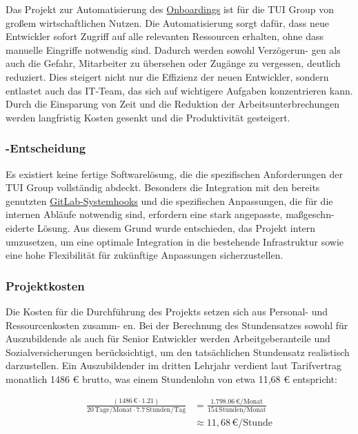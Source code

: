 Das Projekt zur Automatisierung des \hyperlink{Onboarding}{\textcolor{AOBlau}{Onboardings}} ist für die TUI Group von großem wirtschaftlichen Nutzen. Die Automatisierung sorgt dafür, dass neue Entwickler sofort Zugriff auf alle relevanten Ressourcen erhalten, ohne dass manuelle Eingriffe notwendig sind. Dadurch werden sowohl Verzögerun-
gen als auch die Gefahr, Mitarbeiter zu übersehen oder Zugänge zu vergessen, deutlich reduziert. Dies steigert nicht nur die Effizienz der neuen Entwickler, sondern entlastet auch das IT-Team, das sich auf wichtigere Aufgaben konzentrieren kann. Durch die Einsparung von Zeit und die Reduktion der Arbeitsunterbrechungen werden langfristig Kosten gesenkt und die Produktivität gesteigert.

\subsubsection{-Entscheidung}
\label{sec:MakeOrBuyEntscheidung}

Es existiert keine fertige Softwarelösung, die die spezifischen Anforderungen der TUI Group vollständig abdeckt. Besonders die Integration mit den bereits genutzten \hyperlink{GitLabSystemHooks}{\textcolor{AOBlau}{GitLab-Systemhooks}} und die spezifischen Anpassungen, die für die internen Abläufe notwendig sind, erfordern eine stark angepasste, maßgeschn-
eiderte Lösung. Aus diesem Grund wurde entschieden, das Projekt intern umzusetzen, um eine optimale Integration in die bestehende Infrastruktur sowie eine hohe Flexibilität für zukünftige Anpassungen sicherzustellen.

\subsubsection{Projektkosten}
\label{sec:Projektkosten}

Die Kosten für die Durchführung des Projekts setzen sich aus Personal- und Ressourcenkosten zusamm-
en. Bei der Berechnung des Stundensatzes sowohl für Auszubildende als auch für Senior Entwickler werden Arbeitgeberanteile und Sozialversicherungen berücksichtigt, um den tatsächlichen Stundensatz realistisch darzustellen.
\newline
Ein Auszubildender im dritten Lehrjahr verdient laut Tarifvertrag monatlich 1486 € brutto, was einem Stundenlohn von etwa 11,68 € entspricht:

\begin{align}
    \frac{(1486 \, \text{€} \cdot 1.21)}{20 \, \text{Tage/Monat} \cdot 7.7 \, \text{Stunden/Tag}} &= \frac{1.798.06 \, \text{€/Monat}}{154 \, \text{Stunden/Monat}} \tag{1} \\
    &\approx 11,68 \, \text{€/Stunde} \tag{2}
\end{align}



